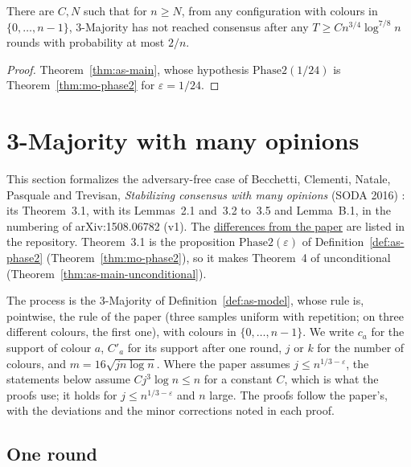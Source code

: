 \begin{theorem}[Theorem~4]\label{thm:as-main-unconditional}
\leanok
{}
There are $C,N$ such that for $n\ge N$, from any configuration with colours in
$\{0,\dots,n-1\}$, 3-Majority has not reached consensus after any $T\ge Cn^{3/4}\log^{7/8}n$
rounds with probability at most $2/n$.
\end{theorem}
\begin{proof}\leanok
Theorem~\ref{thm:as-main}, whose hypothesis $\mathrm{Phase2}(1/24)$ is
Theorem~\ref{thm:mo-phase2} for $\varepsilon=1/24$.
\end{proof}

\section{3-Majority with many opinions}\label{sec:bcnpt16-many-opinions}

This section formalizes the adversary-free case of Becchetti, Clementi, Natale, Pasquale and
Trevisan, \emph{Stabilizing consensus with many opinions} (SODA 2016) \cite{BCNPT16}: its
Theorem~3.1, with its Lemmas~2.1 and~3.2 to~3.5 and Lemma~B.1, in the numbering of
arXiv:1508.06782 (v1). The
\href{https://github.com/formal-dynamics/leanamics/blob/main/3-majority/FORMALIZATION_DIFFERENCES.md#3-majority-with-many-opinions-manyopinions-roadmap-maj-12-a}{differences
from the paper} are listed in the repository. Theorem~3.1 is the proposition $\mathrm{Phase2}(\varepsilon)$ of
Definition~\ref{def:as-phase2} (Theorem~\ref{thm:mo-phase2}), so it makes Theorem~4 of
\cite{BCEKMN17} unconditional (Theorem~\ref{thm:as-main-unconditional}).

The process is the 3-Majority of Definition~\ref{def:as-model}, whose rule is, pointwise, the rule
of the paper (three samples uniform with repetition; on three different colours, the first one),
with colours in $\{0,\dots,n-1\}$. We write $c_a$ for the support of colour $a$, $C'_a$ for its
support after one round, $j$ or $k$ for the number of colours, and $m=16\sqrt{jn\log n}$. Where
the paper assumes $j\le n^{1/3-\varepsilon}$, the statements below assume $Cj^3\log n\le n$ for a
constant $C$, which is what the proofs use; it holds for $j\le n^{1/3-\varepsilon}$ and $n$
large. The proofs follow the paper's, with the deviations and the minor corrections noted in each
proof.

\subsection{One round}

